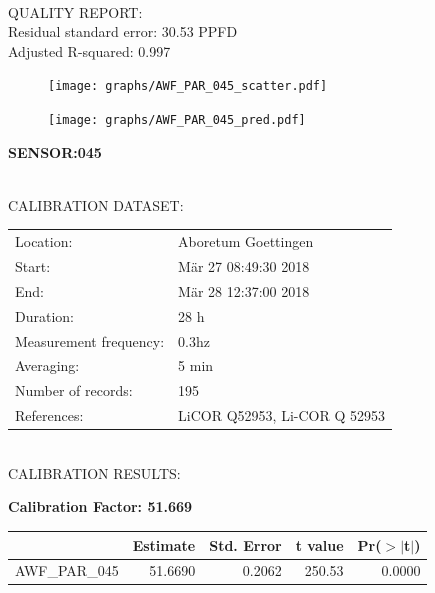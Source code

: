 \documentclass[oneside]{report}
\begin{document}
\hrulefill\\
QUALITY REPORT:\\
Residual standard error: 30.53 PPFD\\
Adjusted R-squared: 0.997



\begin{figure}[H]
  \centering
  \texttt{[image: graphs/AWF\_PAR\_045\_scatter.pdf]}
\end{figure}




\begin{figure}[H]
  \centering
  \texttt{[image: graphs/AWF\_PAR\_045\_pred.pdf]}
\end{figure}

\pagebreak


\begin{center}
\large{\textbf{SENSOR:045}}\\
\end{center}

\hrulefill\\
CALIBRATION DATASET:\\
\begin{table}[h!]
  \centering
  \label{tab:table1}
  \begin{tabular}{ll}
    Location: & Aboretum Goettingen\\ 
    
    
    Start:  & Mär 27 08:49:30 2018 \\
    End:   & Mär 28 12:37:00 2018\\ 
    Duration: & 28 h\\
    Measurement frequency: & 0.3hz\\
    Averaging:  &5 min\\
    Number of records: & 195 \\
    References: & LiCOR Q52953, Li-COR Q 52953 \\
  \end{tabular}
\end{table}

\hrulefill\\
CALIBRATION RESULTS:\\


\begin{center}
\textbf{\large{Calibration Factor: 51.669}}\\
\end{center}
\begin{table}[ht]
\centering
\begin{tabular}{rrrrr}
  \hline
 & Estimate & Std. Error & t value & Pr($>$$|$t$|$) \\ 
  \hline
AWF\_PAR\_045 & 51.6690 & 0.2062 & 250.53 & 0.0000 \\ 
   \hline
\end{tabular}
\end{table}
\end{document}
